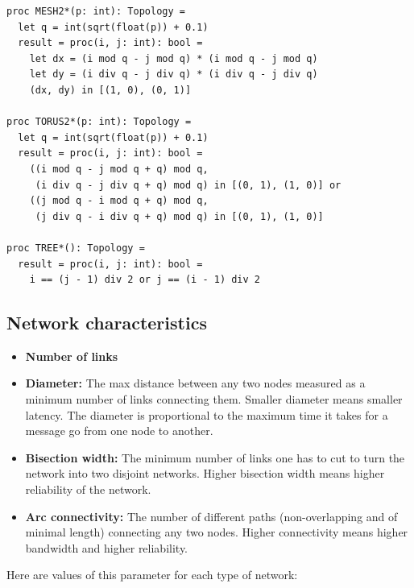 \documentclass[justified, sixbynine]{tufte-book}
\def\ft{\small\tt}
\theoremstyle{plain}%
\newtheorem * {corollary}{Corollary}
\theoremstyle{definition}
\theoremstyle{remark}
\newtheorem * {remark}{Remark}
\newtheorem * {note}{Note}
\begin{document}
\begin{fullwidth}
\begin{lstlisting}[caption={in file: {\ft psim.nim}}]
proc MESH2*(p: int): Topology =
  let q = int(sqrt(float(p)) + 0.1)
  result = proc(i, j: int): bool =
    let dx = (i mod q - j mod q) * (i mod q - j mod q)
    let dy = (i div q - j div q) * (i div q - j div q)
    (dx, dy) in [(1, 0), (0, 1)]

proc TORUS2*(p: int): Topology =
  let q = int(sqrt(float(p)) + 0.1)
  result = proc(i, j: int): bool =
    ((i mod q - j mod q + q) mod q,
     (i div q - j div q + q) mod q) in [(0, 1), (1, 0)] or
    ((j mod q - i mod q + q) mod q,
     (j div q - i div q + q) mod q) in [(0, 1), (1, 0)]

proc TREE*(): Topology =
  result = proc(i, j: int): bool =
    i == (j - 1) div 2 or j == (i - 1) div 2
\end{lstlisting}

\goodbreak\subsection{Network characteristics}


\begin{itemize}
\item {\bf Number of links}

\item {\bf Diameter:} The max distance between any two nodes measured as a minimum number of links connecting them. Smaller diameter means smaller latency. The diameter is proportional to the maximum time it takes for a message go from one node to another.

\item {\bf Bisection width:} The minimum number of links one has to cut to turn the network into two disjoint networks. Higher bisection width means higher reliability of the network.

\item {\bf Arc connectivity:} The number of different paths (non-overlapping and of minimal length) connecting any two nodes. Higher connectivity means higher bandwidth and higher reliability.
\end{itemize}

Here are values of this parameter for each type of network:


\end{fullwidth}
\end{document}
